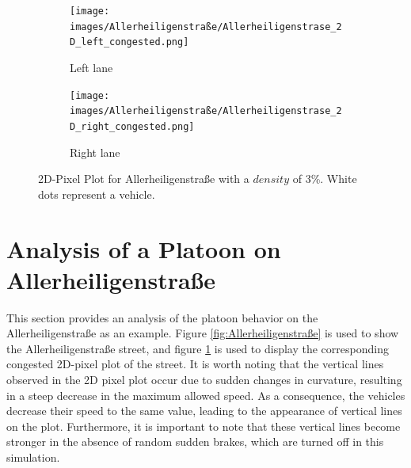 \begin{landscape}
  \begin{figure}
    \centering
    \begin{subfigure}[b]{1.0\linewidth}
      \centering
      \texttt{[image: images/Allerheiligenstraße/Allerheiligenstrase\_2D\_left\_congested.png]}
      \caption{Left lane}
    \end{subfigure}
    \hfill
    \begin{subfigure}[b]{1.0\linewidth}
      \centering
      \texttt{[image: images/Allerheiligenstraße/Allerheiligenstrase\_2D\_right\_congested.png]}
      \caption{Right lane}
    \end{subfigure}
    \caption{2D-Pixel Plot for Allerheiligenstraße with a $density$ of 3\%. White dots represent a vehicle.}
    \label{fig:Allerheiligenstraße_2D}
  \end{figure}
\end{landscape}


\section{Analysis of a Platoon on Allerheiligenstraße}
\label{Analysis of a Platoon on Allerheiligenstraße}
This section provides an analysis of the platoon behavior on the Allerheiligenstraße as an example. Figure \ref{fig:Allerheiligenstraße} is used to show the Allerheiligenstraße street, and figure \ref{fig:Allerheiligenstraße_2D} is used to display the corresponding congested 2D-pixel plot of the street. It is worth noting that the vertical lines observed in the 2D pixel plot occur due to sudden changes in curvature, resulting in a steep decrease in the maximum allowed speed. As a consequence, the vehicles decrease their speed to the same value, leading to the appearance of vertical lines on the plot. Furthermore, it is important to note that these vertical lines become stronger in the absence of random sudden brakes, which are turned off in this simulation.\\

